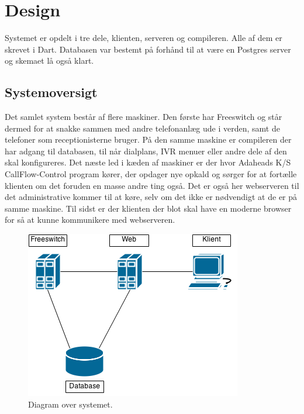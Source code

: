 \chapter{Design}
Systemet er opdelt i tre dele, klienten, serveren og compileren. Alle af dem er skrevet i Dart. Databasen var bestemt på forhånd til at være en Postgres server og skemaet lå også klart.

\section{Systemoversigt}
Det samlet system består af flere maskiner. Den første har Freeswitch og står dermed for at snakke sammen med andre telefonanlæg ude i verden, samt de telefoner som receptionisterne bruger. På den samme maskine er compileren der har adgang til databasen, til når dialplans, IVR menuer eller andre dele af den skal konfigureres. Det næste led i kæden af maskiner er der hvor Adaheads K/S CallFlow-Control program kører, der opdager nye opkald og sørger for at fortælle klienten om det foruden en masse andre ting også. Det er også her webserveren til det administrative kommer til at køre, selv om det ikke er nødvendigt at de er på samme maskine. Til sidst er der klienten der blot skal have en moderne browser for så at kunne kommunikere med webserveren.

\begin{figure}[ht!]
\centering
\includegraphics[scale=0.8]{images/systemdiagram.png}
\caption{Diagram over systemet.}
\label{fig:systemdiagram}
\end{figure}

